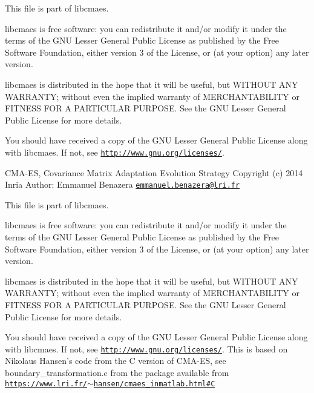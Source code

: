 This file is part of libcmaes.

libcmaes is free software\-: you can redistribute it and/or modify it under the terms of the G\-N\-U Lesser General Public License as published by the Free Software Foundation, either version 3 of the License, or (at your option) any later version.

libcmaes is distributed in the hope that it will be useful, but W\-I\-T\-H\-O\-U\-T A\-N\-Y W\-A\-R\-R\-A\-N\-T\-Y; without even the implied warranty of M\-E\-R\-C\-H\-A\-N\-T\-A\-B\-I\-L\-I\-T\-Y or F\-I\-T\-N\-E\-S\-S F\-O\-R A P\-A\-R\-T\-I\-C\-U\-L\-A\-R P\-U\-R\-P\-O\-S\-E. See the G\-N\-U Lesser General Public License for more details.

You should have received a copy of the G\-N\-U Lesser General Public License along with libcmaes. If not, see \href{http://www.gnu.org/licenses/}{\tt http\-://www.\-gnu.\-org/licenses/}.

C\-M\-A-\/\-E\-S, Covariance Matrix Adaptation Evolution Strategy Copyright (c) 2014 Inria Author\-: Emmanuel Benazera \href{mailto:emmanuel.benazera@lri.fr}{\tt emmanuel.\-benazera@lri.\-fr}

This file is part of libcmaes.

libcmaes is free software\-: you can redistribute it and/or modify it under the terms of the G\-N\-U Lesser General Public License as published by the Free Software Foundation, either version 3 of the License, or (at your option) any later version.

libcmaes is distributed in the hope that it will be useful, but W\-I\-T\-H\-O\-U\-T A\-N\-Y W\-A\-R\-R\-A\-N\-T\-Y; without even the implied warranty of M\-E\-R\-C\-H\-A\-N\-T\-A\-B\-I\-L\-I\-T\-Y or F\-I\-T\-N\-E\-S\-S F\-O\-R A P\-A\-R\-T\-I\-C\-U\-L\-A\-R P\-U\-R\-P\-O\-S\-E. See the G\-N\-U Lesser General Public License for more details.

You should have received a copy of the G\-N\-U Lesser General Public License along with libcmaes. If not, see \href{http://www.gnu.org/licenses/}{\tt http\-://www.\-gnu.\-org/licenses/}. This is based on Nikolaus Hansen's code from the C version of C\-M\-A-\/\-E\-S, see boundary\-\_\-transformation.\-c from the package available from \href{https://www.lri.fr/~hansen/cmaes_inmatlab.html#C}{\tt https\-://www.\-lri.\-fr/$\sim$hansen/cmaes\-\_\-inmatlab.\-html\#\-C} 
